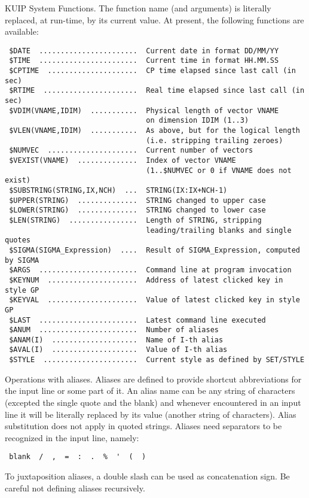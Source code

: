 \BEGTEXT
KUIP System Functions.
The function name (and arguments) is literally replaced,
at run-time, by its current value.
At present, the following functions are available:
\begin{verbatim}
 $DATE  .......................  Current date in format DD/MM/YY
 $TIME  .......................  Current time in format HH.MM.SS
 $CPTIME  .....................  CP time elapsed since last call (in sec)
 $RTIME  ......................  Real time elapsed since last call (in sec)
 $VDIM(VNAME,IDIM)  ...........  Physical length of vector VNAME
                                 on dimension IDIM (1..3)
 $VLEN(VNAME,IDIM)  ...........  As above, but for the logical length
                                 (i.e. stripping trailing zeroes)
 $NUMVEC  .....................  Current number of vectors
 $VEXIST(VNAME)  ..............  Index of vector VNAME
                                 (1..$NUMVEC or 0 if VNAME does not exist)
 $SUBSTRING(STRING,IX,NCH)  ...  STRING(IX:IX+NCH-1)
 $UPPER(STRING)  ..............  STRING changed to upper case
 $LOWER(STRING)  ..............  STRING changed to lower case
 $LEN(STRING)  ................  Length of STRING, stripping
                                 leading/trailing blanks and single quotes
 $SIGMA(SIGMA_Expression)  ....  Result of SIGMA_Expression, computed by SIGMA
 $ARGS  .......................  Command line at program invocation
 $KEYNUM  .....................  Address of latest clicked key in style GP
 $KEYVAL  .....................  Value of latest clicked key in style GP
 $LAST  .......................  Latest command line executed
 $ANUM  .......................  Number of aliases
 $ANAM(I)  ....................  Name of I-th alias
 $AVAL(I)  ....................  Value of I-th alias
 $STYLE  ......................  Current style as defined by SET/STYLE
\end{verbatim}
\ENDTEXT


\BEGTEXT
Operations with aliases.
Aliases are defined to provide shortcut abbreviations for the input line or
some part of it. An alias name can be any string of characters
(excepted the single quote and the blank) and whenever encountered
in an input line it will be literally replaced by its value (another string
of characters).
Alias substitution does not apply in quoted strings.
Aliases need separators to be recognized in the input line, namely:
\begin{verbatim}
 blank  /  ,  =  :  .  %  '  (  )
\end{verbatim}
To juxtaposition aliases, a double slash can be used as concatenation sign.
Be careful not defining aliases recursively.
\ENDTEXT

